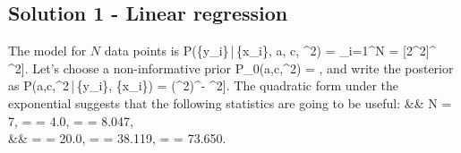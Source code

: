 \documentclass[10pt,oneside]{article}
\begin{document}
\newcommand{\argmax}[1]{\underset{#1}{\operatorname{arg}\operatorname{max}}\;}

 


\lstset{
numbers=left, 
numberstyle=\small, 
numbersep=8pt, 
frame = single, 
language=Python, 
framexleftmargin=15pt
}


\subsection*{Solution 1 - Linear regression}
The model for $N$ data points is
\be
	P(\{y_i\}\,|\,\{x_i\}, a, c, \sigma^2) = \prod_{i=1}^N  \exp{} = [2\pi\sigma^2]^{} \exp\left[-\frac{1}{2\sigma^2}\sum_{i=1}^N \left[y_i - (ax_i + c)\right]^2\right].
\ee
Let's choose a non-informative prior
\be
	P_0(a,c,\sigma^2) = ,
\ee
and write the posterior as 
\be
	P(a,c,\sigma^2\,|\,\{y_i\}, \{x_i\}) =  (\sigma^2)^{-} \exp\left[-\frac{1}{2\sigma^2}\left[y_i - (ax_i + c)\right]^2\right].
\ee
The quadratic form under the exponential suggests that the following statistics are going to be useful:
\ba
	&& N = 7,\qquad {} =  = 4.0, \qquad {} =  =  8.047, \\
	&&  =  = 20.0, \qquad {} =  = 38.119, \qquad {} =  = 73.650.
\ea
\end{document}
